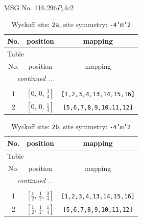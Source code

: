 \documentclass[fleqn,8pt]{jsarticle}
\begin{document}
\setcounter{MaxMatrixCols}{32}

\renewcommand{\tablename}{Table~}
\renewcommand{\figurename}{Figure~}
\begin{center}
\LARGE
MSG No. 116.296\quad$P_{c}\bar{4}c2$
\end{center}
\renewcommand{\arraystretch}{1.2}
\begin{longtable}{ccc}
\caption{Wyckoff site: {\tt 2a}, site symmetry: {\tt -4'm'2}}
 \\
 \hline \hline
No. & position & mapping \\ \hline \endfirsthead

\multicolumn{2}{l}{\tablename\ \thetable{}} \\
 \hline \hline
No. & position & mapping \\ \hline \endhead

 \hline \hline
\multicolumn{2}{r}{\footnotesize\it continued ...} \\ \endfoot

 \hline \hline
\multicolumn{2}{r}{} \\ \endlastfoot

1 & $\left[ 0,\, 0,\, \frac{3}{4} \right]$ & {\tt [1,2,3,4,13,14,15,16]} \\ \hline
2 & $\left[ 0,\, 0,\, \frac{1}{4} \right]$ & {\tt [5,6,7,8,9,10,11,12]} \\
\end{longtable}
\renewcommand{\arraystretch}{1.2}
\begin{longtable}{ccc}
\caption{Wyckoff site: {\tt 2b}, site symmetry: {\tt -4'm'2}}
 \\
 \hline \hline
No. & position & mapping \\ \hline \endfirsthead

\multicolumn{2}{l}{\tablename\ \thetable{}} \\
 \hline \hline
No. & position & mapping \\ \hline \endhead

 \hline \hline
\multicolumn{2}{r}{\footnotesize\it continued ...} \\ \endfoot

 \hline \hline
\multicolumn{2}{r}{} \\ \endlastfoot

1 & $\left[ \frac{1}{2},\, \frac{1}{2},\, \frac{3}{4} \right]$ & {\tt [1,2,3,4,13,14,15,16]} \\ \hline
2 & $\left[ \frac{1}{2},\, \frac{1}{2},\, \frac{1}{4} \right]$ & {\tt [5,6,7,8,9,10,11,12]} \\
\end{longtable}
\end{document}
